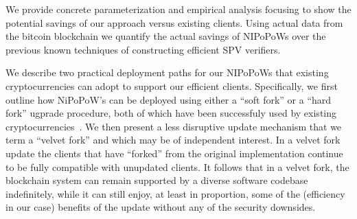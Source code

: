We provide concrete parameterization and empirical analysis focusing to show the
potential savings of our approach versus existing clients. Using actual data
from the bitcoin blockchain we quantify the actual savings of NIPoPoWs over the
previous known techniques of constructing efficient SPV verifiers.

We describe two practical deployment paths for our NIPoPoWs that existing
cryptocurrencies can adopt to support our efficient clients. Specifically, we
first outline how NiPoPoW's can be deployed using either a ``soft fork'' or a
``hard fork'' ugprade procedure, both of which have been successfuly used by
existing cryptocurrencies~\cite{sok}. We then present a less disruptive update
mechanism that we term a ``velvet fork'' and which may be of independent
interest. In a velvet fork update the clients that have ``forked'' from the
original implementation continue to be fully compatible with unupdated clients.
It follows that in a velvet fork, the blockchain system can remain supported by
a diverse software codebase indefinitely, while it can still enjoy, at least in
proportion, some of the (efficiency in our case) benefits of the update without
any of the security downsides.
